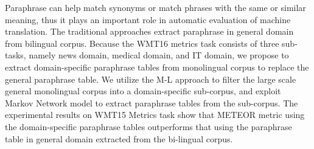 Paraphrase can help match synonyms or match phrases with the same or similar meaning, thus it plays an important role in automatic evaluation of machine translation. The traditional approaches extract paraphrase in general domain from bilingual corpus. Because the WMT16 metrics task consists of three sub-tasks, namely news domain, medical domain, and IT domain, we propose to extract domain-specific paraphrase tables from monolingual corpus to replace the general paraphrase table. We utilize the M-L approach to filter the large scale general monolingual corpus into a domain-specific sub-corpus, and exploit Markov Network model to extract paraphrase tables from the sub-corpus. The experimental results on WMT15 Metrics task show that METEOR metric using the domain-specific paraphrase tables outperforms that using the paraphrase table in general domain extracted from the bi-lingual corpus.
